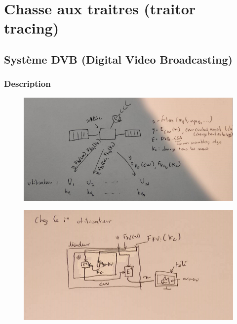 \chapter{Chasse aux traitres (traitor tracing)}
    \section{Système DVB (Digital Video Broadcasting)}
        \subsection{Description}
        \begin{figure}[H]
            \centering
            \includegraphics[width=.5\textwidth]{pictures/2_3}
        \end{figure} \noindent
        \begin{figure}[H]
            \centering
            \includegraphics[width=.5\textwidth]{pictures/2_4}
        \end{figure} \noindent
